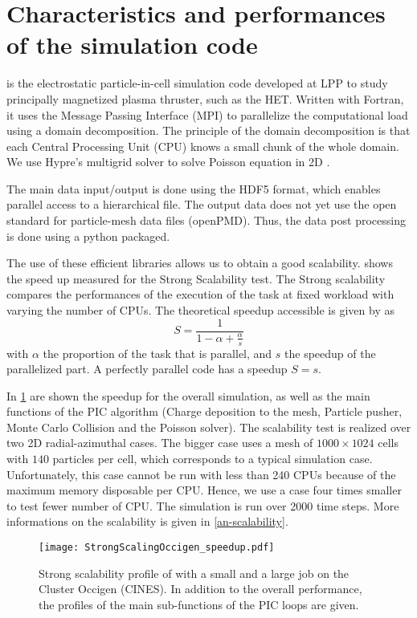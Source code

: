 

\section{Characteristics and performances of the  \LPPic simulation code }
\label{sec-lppic}


\LPPic is the electrostatic particle-in-cell simulation code developed at \ac{LPP} to study principally magnetized plasma thruster, such as the \ac{HET}.
Written with Fortran, it uses the Message Passing Interface (MPI) to parallelize the computational load using a domain decomposition.
The principle of the domain decomposition is that each Central Processing Unit (CPU) knows a small chunk of the whole domain.
We use {\sc Hypre}'s multigrid solver to solve Poisson equation in \ac{2D} \citep{falgout2002}.

The main data input/output is done using the HDF5 format, which enables parallel access to a hierarchical file.
The output data does not yet use the open standard for particle-mesh data files (openPMD).
Thus, the data post processing is done using a python packaged.

The use of these efficient libraries allows us to obtain a good scalability.
 shows the speed up measured for the Strong Scalability test.
The Strong scalability compares the performances of the execution of the task at fixed workload with varying the number of CPUs.
The theoretical speedup accessible is given by \citet{amdahl1967} as
\begin{equation} \label{eq-amdahl}
  S = \frac{1}{1 - \alpha + \frac{\alpha}{s}}
\end{equation}
with $\alpha$ the proportion of the task that is parallel, and $s$ the speedup of the parallelized part.
A perfectly parallel code has a speedup $S=s$.

In \cref{fig-strongperfo} are shown the speedup for the overall simulation, as well as the main functions of the \ac{PIC} algorithm (Charge deposition to the mesh, Particle pusher, Monte Carlo Collision and the Poisson solver).
The scalability test is realized over two \ac{2D} radial-azimuthal cases. 
The bigger case uses a mesh of $1000\times1024$ cells with $140$ particles per cell, which corresponds to a typical simulation case.
Unfortunately, this case cannot be run with less than 240 CPUs because of the maximum memory disposable per CPU. 
Hence, we use a case four times smaller to test fewer number of CPU.
The simulation is run over 2000 time steps.
More informations on the scalability is given in \cref{an-scalability}.
\begin{figure}[hbt]
  \centering
  \texttt{[image: StrongScalingOccigen\_speedup.pdf]}
  \caption{Strong scalability profile of \LPPic with a small and a large job on the Cluster Occigen (CINES). In addition to the overall performance, the profiles of the main sub-functions of the \acs{PIC} loops are given. }
  \label{fig-strongperfo}
\end{figure}


